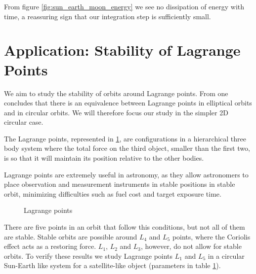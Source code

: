 \documentclass{aa}
\begin{document}
From figure \ref{fig:sun_earth_moon_energy} we see no dissipation of energy with
time, a reassuring sign that our integration step is sufficiently small.


\section{Application: Stability of Lagrange Points}

We aim to study the stability of orbits around Lagrange points. From \cite{todoran_elliptical_1992} one
concludes that there is an equivalence between Lagrange points in elliptical
orbits and in circular orbits. We will therefore focus our study in the simpler
2D circular case.

The Lagrange points, represented in \ref{fig:lagrange_points}, are
configurations in a hierarchical three body system where the total force on the third object,
smaller than the first two, is so that it will maintain its position relative to
the other bodies.

Lagrange points are extremely useful in astronomy, as they allow astronomers to
place observation and measurement instruments in stable positions in stable
orbit, minimizing difficulties such as fuel cost and target exposure time.

\begin{figure}
  \centering
  \caption{Lagrange points}
  \label{fig:lagrange_points}
\end{figure}

There are five points in an orbit that follow this conditions, but not all of
them are stable. Stable orbits are possible around $L_4$ and $L_5$ points, where
the Coriolis effect acts as a restoring force. $L_1$, $L_2$ and $L_3$,
however, do not allow for stable orbits. To verify these results we study
Lagrange points $L_1$ and $L_5$ in a circular Sun-Earth like system for a
satellite-like object (parameters in table \ref{}).
\end{document}
